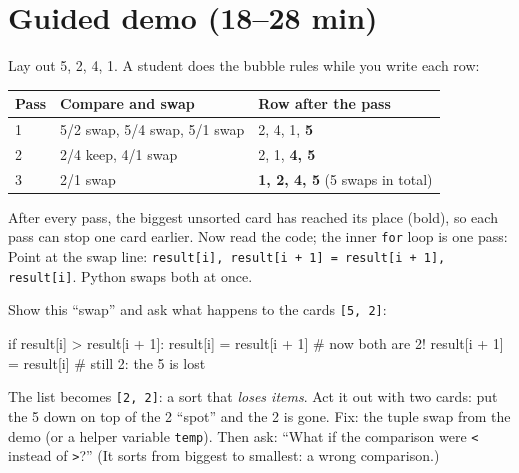 \section{Guided demo (18--28 min)}
\begin{workedexample}
Lay out 5, 2, 4, 1. A student does the bubble rules while you write each row:
\begin{center}
\begin{tabular}{@{}lll@{}}
\toprule
\textbf{Pass} & \textbf{Compare and swap} & \textbf{Row after the pass} \\ \midrule
1 & 5/2 swap, 5/4 swap, 5/1 swap & 2, 4, 1, \textbf{5} \\
2 & 2/4 keep, 4/1 swap & 2, 1, \textbf{4, 5} \\
3 & 2/1 swap & \textbf{1, 2, 4, 5} (5 swaps in total) \\
\bottomrule
\end{tabular}
\end{center}
After every pass, the biggest unsorted card has reached its place (bold), so each pass can stop one card earlier. Now read the code; the inner \texttt{for} loop is one pass:
Point at the swap line: \texttt{result[i], result[i + 1] = result[i + 1], result[i]}. Python swaps both at once.
\end{workedexample}

\begin{bughunt}
Show this \enquote{swap} and ask what happens to the cards \texttt{[5, 2]}:
\begin{pycode}
if result[i] > result[i + 1]:
    result[i] = result[i + 1]       # now both are 2!
    result[i + 1] = result[i]       # still 2: the 5 is lost
\end{pycode}
The list becomes \texttt{[2, 2]}: a sort that \emph{loses items}. Act it out with two cards: put the 5 down on top of the 2 \enquote{spot} and the 2 is gone. Fix: the tuple swap from the demo (or a helper variable \texttt{temp}). Then ask: \enquote{What if the comparison were \texttt{<} instead of \texttt{>}?} (It sorts from biggest to smallest: a wrong comparison.)
\end{bughunt}

